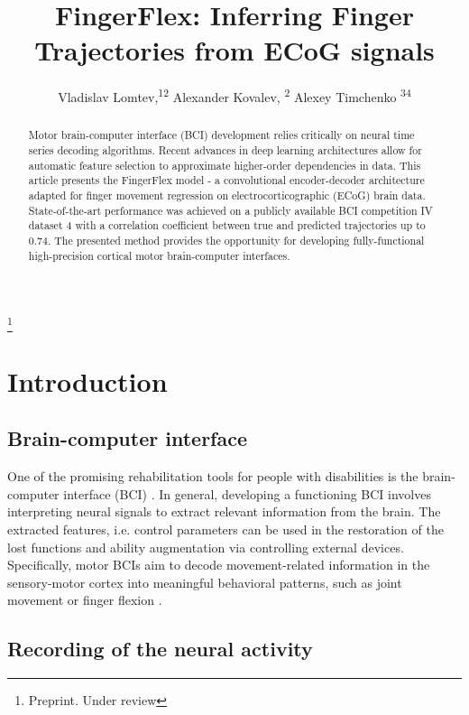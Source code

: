 \documentclass[letterpaper]{article} \usepackage{aaai22}  \usepackage{times}  \usepackage{helvet}  \usepackage{courier}  \usepackage[hyphens]{url}  \usepackage{graphicx} \urlstyle{rm} \def\UrlFont{\rm}  \usepackage{natbib}  \usepackage{caption} \DeclareCaptionStyle{ruled}{labelfont=normalfont,labelsep=colon,strut=off} \frenchspacing  \setlength{\pdfpagewidth}{8.5in}  \setlength{\pdfpageheight}{11in}  \usepackage{algorithm}
\title{FingerFlex: Inferring Finger Trajectories from ECoG signals}
\author {
Vladislav Lomtev,\textsuperscript{\rm 1}\textsuperscript{\rm 2}
    Alexander Kovalev, \textsuperscript{\rm 2}
    Alexey Timchenko \textsuperscript{\rm 3}\textsuperscript{\rm 4}
}
\newcommand\blfootnote[1]{\begingroup
  \renewcommand\thefootnote{}\footnote{#1}\addtocounter{footnote}{-1}\endgroup
}
\begin{document}
\maketitle

\begin{abstract}
Motor brain-computer interface (BCI) development relies critically on neural time series decoding algorithms. Recent advances in deep learning architectures allow for automatic feature selection to approximate higher-order dependencies in data. This article presents the FingerFlex model - a convolutional encoder-decoder architecture adapted for finger movement regression on electrocorticographic (ECoG) brain data. State-of-the-art performance was achieved on a publicly available BCI competition IV dataset 4 with a correlation coefficient between true and predicted trajectories up to 0.74. The presented method provides the opportunity for developing fully-functional high-precision cortical motor brain-computer interfaces.

\end{abstract}
\blfootnote{Preprint. Under review}

\section{Introduction}
\subsection*{Brain-computer interface}


One of the promising rehabilitation tools for people with disabilities is the brain-computer interface (BCI) \citep{lebedev2006, bamdad2015, yuan2014}. In general, developing a functioning BCI involves interpreting neural signals to extract relevant information from the brain. The extracted features, i.e. control parameters can be used in the restoration of the lost functions and ability augmentation via controlling external devices. Specifically, motor BCIs aim to decode movement-related information in the sensory-motor cortex into meaningful behavioral patterns, such as joint movement or finger flexion \citep{tam2019, volkova2019}. 

\subsection*{Recording of the neural activity}
\end{document}

